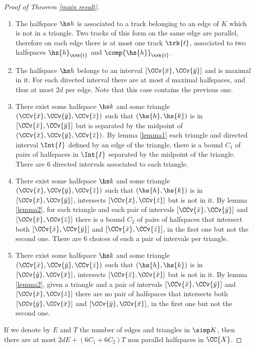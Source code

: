 \begin{proof}[Proof of Theorem \ref{main result}]
\begin{enumerate}
\item \label{enum1} The halfspace $\hs h$ is associated to a track belonging to an edge of $K$ which is not in a triangle. Two tracks of this form on the same edge are parallel, therefore on each edge there is at most one track $\trk{t}$, associated to two halfspaces $\hs{h}_{\trk{t}}$ and $\comp{\hs{h}}_{\trk{t}}$.
\item \label{enum2} The halfspace $\hs h$ belongs to an interval $[\CCv{\bar{x}}, \CCv{\bar{y}}]$ and is maximal in it. For each directed interval there are at most $d$ maximal halfspaces, and thus at most $2 d$ per edge.  Note that this case contains the previous one.
\item  \label{enum3} There exist some halfspace $\hs k$ and some triangle $(\CCv{\bar{x}}, \CCv{\bar{y}}, \CCv{\bar{z}})$ such that $(\hs{h}, \hs{k})$ is \adjP in  $[\CCv{\bar{x}}, \CCv{\bar{y}}]$ but is separated by the midpoint of $(\CCv{\bar{x}}, \CCv{\bar{y}}, \CCv{\bar{z}})$. By lemma \ref{lemma1} each triangle and directed interval $\Int{I}$ defined by an edge of the triangle, there is a bound $C_1$ of pairs of \adjP halfspaces in $\Int{I}$ separated by the midpoint of the triangle. There are $6$ directed intervals associated to each triangle.
\item \label{enum4} There exist some halfspace $\hs k$ and some triangle $(\CCv{\bar{x}}, \CCv{\bar{y}}, \CCv{\bar{z}})$ such that $(\hs{h},\hs{k})$ is \adjP in  $[\CCv{\bar{x}}, \CCv{\bar{y}}]$, intersects $[\CCv{\bar{x}}, \CCv{\bar{z}}]$ but is not \adjP in it. By lemma \ref{lemma2}, for each triangle and each pair of intervals $[\CCv{\bar{x}}, \CCv{\bar{y}}]$ and $[\CCv{\bar{x}}, \CCv{\bar{z}}]$ there is a bound $C_2$ of pairs of halfspaces   that intersect both $[\CCv{\bar{x}}, \CCv{\bar{y}}]$ and $[\CCv{\bar{x}}, \CCv{\bar{z}}]$, \adjP in the first one but not the second one. There are $6$ choices of such a pair of intervals per triangle.
\item \label{enum5} There exist some halfspace $\hs k$ and some triangle $(\CCv{\bar{x}}, \CCv{\bar{y}}, \CCv{\bar{z}})$ such that $(\hs{h},\hs{k})$ is \adjP in  $[\CCv{\bar{y}}, \CCv{\bar{x}}]$, intersects $[\CCv{\bar{z}}, \CCv{\bar{x}}]$ but is not \adjP in it. By lemma \ref{lemma2}, given a triangle and a pair of intervals $[\CCv{\bar{x}}, \CCv{\bar{y}}]$ and $[\CCv{\bar{x}}, \CCv{\bar{z}}]$ there are no pair of halfspaces  that intersects both $[\CCv{\bar{y}}, \CCv{\bar{x}}]$ and $[\CCv{\bar{y}}, \CCv{\bar{x}}]$, \adjP in the first one but not the second one.
\end{enumerate}


 If we denote by $E$ and $T$ the number of edges and triangles in $\simp K$, then there are at most $2dE +(6C_1+6C_2)T$ non parallel halfspaces  in $\CC{X}$.
\end{proof}